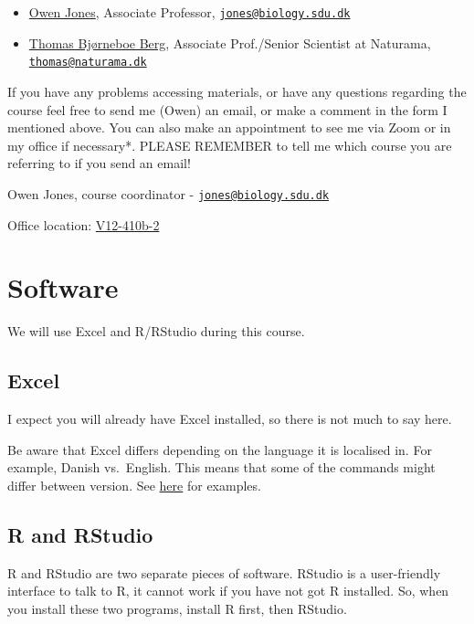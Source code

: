 \documentclass[
  a4paper]{book}
\providecommand{\tightlist}{%
  \setlength{\itemsep}{0pt}\setlength{\parskip}{0pt}}
\begin{document}
\begin{itemize}
\tightlist
\item
  \href{https://portal.findresearcher.sdu.dk/en/persons/jones}{Owen Jones}, Associate Professor, \href{mailto:jones@biology.sdu.dk}{\nolinkurl{jones@biology.sdu.dk}}
\item
  \href{https://portal.findresearcher.sdu.dk/en/persons/thomasbb}{Thomas Bjørneboe Berg}, Associate Prof./Senior Scientist at Naturama, \href{mailto:thomas@naturama.dk}{\nolinkurl{thomas@naturama.dk}}
\end{itemize}

If you have any problems accessing materials, or have any questions regarding the course feel free to send me (Owen) an email, or make a comment in the form I mentioned above. You can also make an appointment to see me via Zoom or in my office if necessary*. PLEASE REMEMBER to tell me which course you are referring to if you send an email!

Owen Jones, course coordinator - \href{mailto:jones@biology.sdu.dk}{\nolinkurl{jones@biology.sdu.dk}}

Office location: \href{https://clients.mapsindoors.com/sdu/573f26e4bc1f571b08094312/details/563cb94f423b7d0540c9a605}{V12-410b-2}

\section{Software}\label{software}

We will use Excel and R/RStudio during this course.

\subsection{Excel}\label{excel}

I expect you will already have Excel installed, so there is not much to say here.

Be aware that Excel differs depending on the language it is localised in. For example, Danish vs.~English. This means that some of the commands might differ between version.
See \href{https://easy-excel.com/excel-in-other-languages/excel-formulas-in-danish/}{here} for examples.

\subsection{R and RStudio}\label{r-and-rstudio}

R and RStudio are two separate pieces of software. RStudio is a user-friendly interface to talk to R, it cannot work if you have not got R installed. So, when you install these two programs, install R first, then RStudio.
\end{document}
